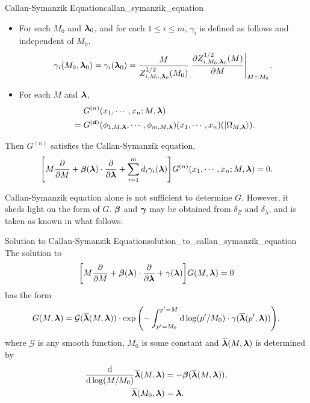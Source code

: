 \documentclass{article}
\begin{document}
\begin{theorem}{Callan-Symanzik Equation}{callan_symanzik_equation}
\begin{itemize}
        \[ \vb*{\beta}(M_0,\vb*{\lambda}_0) = \vb*{\beta}(\vb*{\lambda}_0) = M_0 \eval{\pdv{\vb*{\lambda}_{M_0,\vb*{\lambda}_0}(M)}{M}}_{M=M_0}. \]
        \item For each $M_0$ and $\vb*{\lambda}_0$, and for each $1\le i \le m$, $\gamma_i$ is defined as follows and independent of $M_0$.
        \[ \gamma_i(M_0,\vb*{\lambda}_0) = \gamma_i(\vb*{\lambda}_0) = \frac{M}{Z^{1/2}_{i,M_0,\vb*{\lambda}_0}(M_0)} \eval{\pdv{Z^{1/2}_{i,M_0,\vb*{\lambda}_0}(M)}{M}}_{M=M_0}. \]
        \item For each $M$ and $\vb*{\lambda}$,
        \begin{align*}
            &\phantom{{}={}} G^{(n)}(x_1,\cdots,x_n;M,\vb*{\lambda}) \\
            &= G^{(\vb*{d})}(\phi_{1,M,\vb*{\lambda}},\cdots,\phi_{m,M,\vb*{\lambda}})(x_1,\cdots,x_n)(\ket{\Omega_{M,\vb*{\lambda}}}).
        \end{align*}
    \end{itemize}
    Then $G^{(n)}$ satisfies the Callan-Symanzik equation,
    \[ \qty[M \pdv{}{M} + \vb*{\beta}(\vb*{\lambda}) \cdot \pdv{}{\vb*{\lambda}} + \sum_{i=1}^m d_i \gamma_i(\vb*{\lambda})] G^{(n)}(x_1,\cdots,x_n;M,\vb*{\lambda}) = 0. \]
\end{theorem}

Callan-Symanzik equation alone is not sufficient to determine $G$.
However, it sheds light on the form of $G$.
$\vb*{\beta}$ and $\vb*{\gamma}$ may be obtained from $\delta_Z$ and $\delta_\lambda$, and is taken as known in what follows.

\begin{theorem}{Solution to Callan-Symanzik Equation}{solution_to_callan_symanzik_equation}
    The solution to
    \[ \qty[M\pdv{}{M} + \vb*{\beta}(\vb*{\lambda})\cdot \pdv{}{\vb*{\lambda}} + \gamma(\vb*{\lambda})]G(M,\vb*{\lambda}) = 0 \]
    has the form
    \[ G(M,\vb*{\lambda}) = \mathcal{G}(\overline{\vb*{\lambda}}(M,\vb*{\lambda})) \cdot \exp\qty(-\int_{p'=M_0}^{p'=M} \dd{\log(p'/M_0)} \cdot \gamma(\overline{\vb*{\lambda}}(p',\vb*{\lambda}))), \]
    where $\mathcal{G}$ is any smooth function, $M_0$ is some constant and $\overline{\vb*{\lambda}}(M,\vb*{\lambda})$ is determined by
    \begin{align*}
        \dv{}{\log(M/M_0)} \overline{\vb*{\lambda}}(M,\vb*{\lambda}) &= -\vb*{\beta}(\overline{\vb*{\lambda}}(M,\vb*{\lambda})), \\
        \overline{\vb*{\lambda}}(M_0,\vb*{\lambda}) &= \vb*{\lambda}.
    \end{align*}
\end{theorem}

% 
% 
\end{document}
